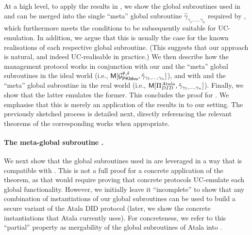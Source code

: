 At a high level, to apply the results in \cite{bch+20,bhz21}, we show the global
subroutines used in \IdealGPKIDID and \RealPKIDIDAtala can be merged into the
single ``meta'' global subroutine $\hat{\gamma}_{\gamma_1,\dots,\gamma_n}$
required by , which furthermore meets the conditions to be
subsequently suitable for UC-emulation. In addition, we argue that this is
usually the case for the known realisations of each respective global
subroutine. (This suggests that our approach is natural, and indeed
UC-realisable in practice.)
%
We then describe how the management protocol \UCM works in conjunction with
our \IdealGPKIDID and the ``meta'' global subroutines in the ideal world (i.e.,
$\mathsf{M}[\mathcal{G}^{\mathtt{P},\delta}_{\mathsf{PKIdvu}},\hat{\gamma}_{\gamma_1,\dots,\gamma_n}]$), and
with \RealPKIDIDAtala and the ``meta'' global subroutine in the real world
(i.e., $\mathsf{M}[\Pi_{DID}^{Atala},\hat{\gamma}_{\gamma_1,\dots,\gamma_n}]$).
%
Finally, we show that the latter emulates the former. This concludes the proof
for .
%
We emphasise that this is merely an application of the results in
\cite{bch+20,bhz21} to our setting. The previously sketched process is detailed
next, directly referencing the relevant theorems of the corresponding works when
appropriate.

\paragraph{The meta-global subroutine \gAtala.} %
We next show that the global subroutines used in \RealPKIDIDAtala are leveraged
in a way that is compatible with \cite[Theorem 4.3]{bhz21}. This is not a full
proof for a concrete application of the theorem, as that would require proving
that concrete protocols UC-emulate each global functionality. However, we
initially leave it ``incomplete'' to show that any combination of instantiations
of our global subroutines can be used to build a secure variant of the Atala
DID protocol (later, we show the concrete instantiations that Atala currently
uses). For concreteness, we refer to this ``partial'' property as mergability
of the global subroutines of Atala into \gAtala.

